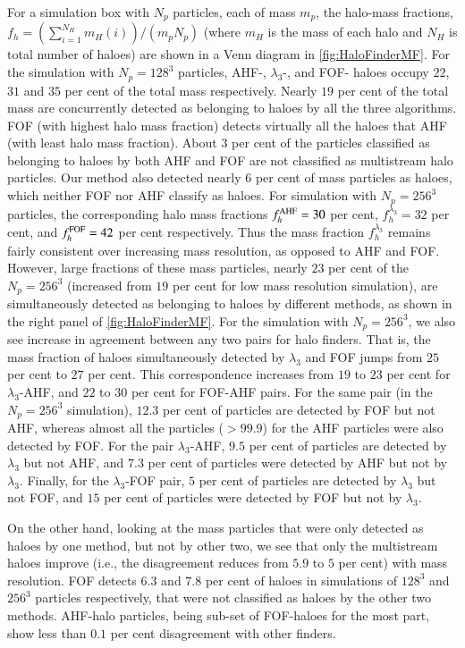 For a simulation box with $N_p$ particles, each of mass $m_p$, the halo-mass fractions, $\displaystyle f_h = (\sum\limits_{i=1}^{N_H} m_H(i)) / (m_p N_p)$ (where $m_H$ is the mass of each halo and $N_H$ is total number of haloes) are shown in a Venn diagram in \autoref{fig:HaloFinderMF}. For the simulation with $N_p = 128^3$ particles, AHF-, $\lambda_3$-, and FOF- haloes occupy $22$, $31$ and $35$ per cent of the total mass respectively. Nearly $19$ per cent of the total mass are concurrently detected as belonging to haloes by all the three algorithms. FOF (with highest halo mass fraction) detects virtually all the haloes that AHF (with least halo mass fraction). About $3$ per cent of the particles classified as belonging to haloes by both AHF and FOF are not classified as multistream halo particles. Our method also detected nearly $6$ per cent of mass particles as haloes, which neither FOF nor AHF classify as haloes. For simulation with $N_p = 256^3$ particles, the corresponding halo mass fractions $f_h^{\rm AHF} = 30$ per cent, $f_h^{\lambda_3} = 32$ per cent, and $f_h^{\rm FOF} = 42$ per cent respectively. Thus the mass fraction $f_h^{\lambda_3}$ remains fairly consistent over increasing mass resolution, as opposed to AHF and FOF. However, large fractions of these mass particles, nearly $23$ per cent of the $N_p = 256^3$ (increased from $19$ per cent for low mass resolution simulation), are simultaneously detected as belonging to haloes by different methods, as shown in the right panel of \autoref{fig:HaloFinderMF}. For the simulation with $N_p = 256^3$, we also see increase in agreement between any two pairs for halo finders. That is, the mass fraction of haloes simultaneously detected by $\lambda_3$ and FOF jumps from $25$ per cent to $27$ per cent. This correspondence increases from $19$ to $23$ per cent for $\lambda_3$-AHF, and $22$ to $30$ per cent for FOF-AHF pairs. For the same pair (in the $N_p = 256^3$ simulation), $12.3$ per cent of particles are detected by FOF but not AHF, whereas almost all the particles ($>99.9$) for the AHF particles were also detected by FOF. For the pair $\lambda_3$-AHF, $9.5$ per cent of particles are detected by $\lambda_3$ but not AHF, and $7.3$ per cent of particles were detected by AHF but not by $\lambda_3$. Finally, for the $\lambda_3$-FOF pair, $5$ per cent of particles are detected by $\lambda_3$ but not FOF, and $15$ per cent of particles were detected by FOF but not by $\lambda_3$. 

On the other hand, looking at the mass particles that were only detected as haloes by one method, but not by other two, we see that only the multistream haloes improve (i.e., the disagreement reduces from $5.9$ to $5$ per cent) with mass resolution. FOF detects $6.3$ and $7.8$ per cent of haloes in simulations of $128^3$ and $256^3$ particles respectively, that were not classified as haloes by the other two methods. AHF-halo particles, being sub-set of FOF-haloes for the most part, show less than $0.1$ per cent disagreement with other finders.

